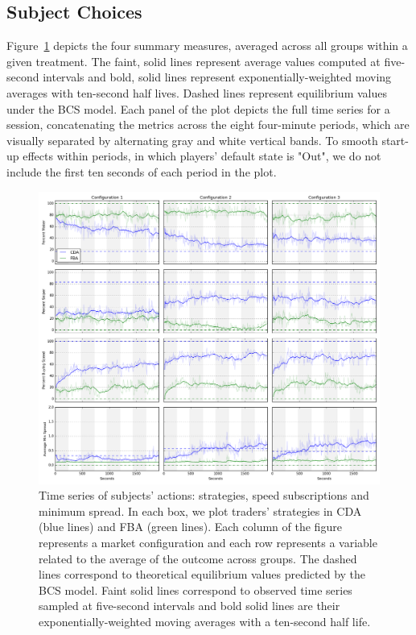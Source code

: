\documentclass[12pt]{article}
\begin{document}
\subsection{Subject Choices}
Figure~\ref{fig:allPlots} depicts the four summary measures, averaged across all groups within a given treatment. The faint, solid lines represent average values computed at five-second intervals and bold, solid lines represent exponentially-weighted moving averages with ten-second half lives. Dashed lines represent equilibrium values under the BCS model. Each panel of the plot depicts the full time series for a session, concatenating the metrics across the eight four-minute periods, which are visually separated by alternating gray and white vertical bands. To smooth start-up effects within periods, in which players' default state is "Out", we do not include the first ten seconds of each period in the plot.
\begin{figure}
\centering
\includegraphics[width=1\textwidth]{img/allPlots.png}
\caption{Time series of subjects' actions: strategies, speed subscriptions and minimum spread. {\small In each box, we plot traders' strategies in CDA (blue lines) and FBA (green lines). Each column of the figure represents a market configuration and each row represents a variable related to the average of the outcome across groups. The dashed lines correspond to theoretical equilibrium values predicted by the BCS model. Faint solid lines correspond to observed time series sampled at five-second intervals and bold solid lines are their exponentially-weighted moving averages with a ten-second half life.} \label{fig:allPlots} } 
\end{figure}
\end{document}
